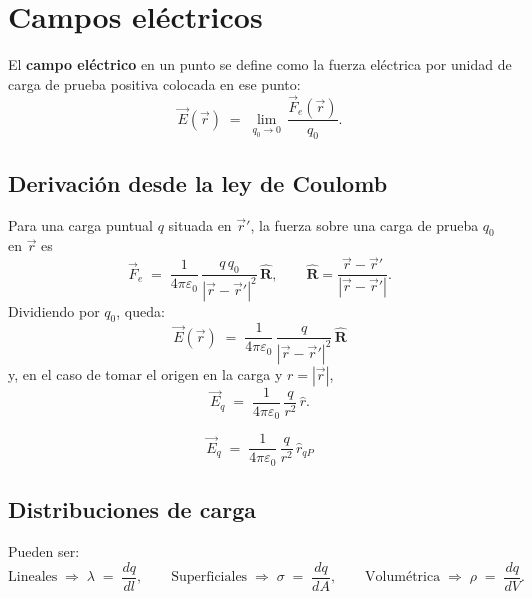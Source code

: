 \documentclass[a4paper,12pt]{article}
\begin{document}
\newpage

\section{Campos eléctricos}
\noindent
El \textbf{campo eléctrico} en un punto se define como la fuerza eléctrica por unidad de carga de prueba positiva colocada en ese punto:
\[
\vec E(\vec r) \;=\; \lim_{q_0 \to 0}\,\frac{\vec F_e(\vec r)}{q_0}.
\]

\subsection*{Derivación desde la ley de Coulomb}
\noindent
Para una carga puntual $q$ situada en $\vec r'$, la fuerza sobre una carga de prueba $q_0$ en $\vec r$ es
\[
\vec F_e \;=\; \frac{1}{4\pi\varepsilon_0}\,\frac{q\,q_0}{|\vec r-\vec r'|^2}\,\hat{\mathbf R},
\qquad \hat{\mathbf R}=\frac{\vec r-\vec r'}{|\vec r-\vec r'|}.
\]
Dividiendo por $q_0$, queda:
\[
\boxed{\;\vec E(\vec r)\;=\;\frac{1}{4\pi\varepsilon_0}\,\frac{q}{|\vec r-\vec r'|^2}\,\hat{\mathbf R}\;}
\]
y, en el caso de tomar el origen en la carga y $r=|\vec r|$,
\[
\vec E_q \;=\; \frac{1}{4\pi\varepsilon_0}\,\frac{q}{r^2}\,\hat r .
\]

\begin{center}
\end{center}

\[
\vec E_q \;=\; \frac{1}{4\pi\varepsilon_0}\,\frac{q}{r^2}\,\hat r_{qP}
\]

\newpage

\subsection*{Distribuciones de carga}
Pueden ser:
\[
\text{Lineales} \;\Rightarrow\; \lambda \;=\; \frac{dq}{dl},
\qquad
\text{Superficiales} \;\Rightarrow\; \sigma \;=\; \frac{dq}{dA},
\qquad
\text{Volumétrica} \;\Rightarrow\; \rho \;=\; \frac{dq}{dV}.
\]
\end{document}
